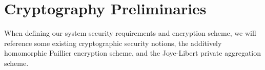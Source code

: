 \documentclass[twocolumn]{autart}
\begin{document}
% 
% 

\section{Cryptography Preliminaries} \label{sec:crypto_prelim}
When defining our system security requirements and encryption scheme, we will reference some existing cryptographic security notions, the additively homomorphic Paillier encryption scheme, and the Joye-Libert private aggregation scheme.

% 
% 
\end{document}
